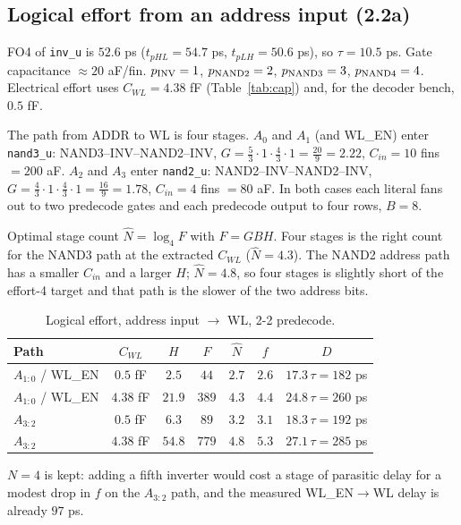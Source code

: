 \documentclass[10pt,letterpaper]{article}
\newcommand{\code}[1]{\texttt{#1}}
\begin{document}
\subsection{Logical effort from an address input (2.2a)}\label{sec:le}
FO4 of \code{inv\_u} is $52.6$ ps ($t_{pHL}=54.7$ ps, $t_{pLH}=50.6$ ps), so $\tau=10.5$ ps. Gate capacitance $\approx20$ aF/fin. $p_{\rm INV}=1$, $p_{\rm NAND2}=2$, $p_{\rm NAND3}=3$, $p_{\rm NAND4}=4$. Electrical effort uses $C_{WL}=4.38$ fF (Table~\ref{tab:cap}) and, for the decoder bench, $0.5$ fF.

The path from ADDR to WL is four stages. $A_0$ and $A_1$ (and WL\_EN) enter \code{nand3\_u}: NAND3--INV--NAND2--INV, $G=\tfrac53\cdot1\cdot\tfrac43\cdot1=\tfrac{20}{9}=2.22$, $C_{in}=10$ fins $=200$ aF. $A_2$ and $A_3$ enter \code{nand2\_u}: NAND2--INV--NAND2--INV, $G=\tfrac43\cdot1\cdot\tfrac43\cdot1=\tfrac{16}{9}=1.78$, $C_{in}=4$ fins $=80$ aF. In both cases each literal fans out to two predecode gates and each predecode output to four rows, $B=8$.

Optimal stage count $\hat N=\log_4 F$ with $F=GBH$. Four stages is the right count for the NAND3 path at the extracted $C_{WL}$ ($\hat N=4.3$). The NAND2 address path has a smaller $C_{in}$ and a larger $H$; $\hat N=4.8$, so four stages is slightly short of the effort-4 target and that path is the slower of the two address bits.

\begin{table}[H]\centering\small
\caption{Logical effort, address input $\to$ WL, 2-2 predecode.}\label{tab:leA}
\begin{tabular}{@{}lcccccc@{}}\toprule Path & $C_{WL}$ & $H$ & $F$ & $\hat N$ & $f$ & $D$\\\midrule
$A_{1:0}$ / WL\_EN & $0.5$ fF & $2.5$ & $44$ & $2.7$ & $2.6$ & $17.3\,\tau=182$ ps\\
$A_{1:0}$ / WL\_EN & $4.38$ fF & $21.9$ & $389$ & $4.3$ & $4.4$ & $24.8\,\tau=260$ ps\\
$A_{3:2}$ & $0.5$ fF & $6.3$ & $89$ & $3.2$ & $3.1$ & $18.3\,\tau=192$ ps\\
$A_{3:2}$ & $4.38$ fF & $54.8$ & $779$ & $4.8$ & $5.3$ & $27.1\,\tau=285$ ps\\\bottomrule\end{tabular}
\end{table}
$N=4$ is kept: adding a fifth inverter would cost a stage of parasitic delay for a modest drop in $f$ on the $A_{3:2}$ path, and the measured WL\_EN$\to$WL delay is already $97$ ps.
\end{document}
